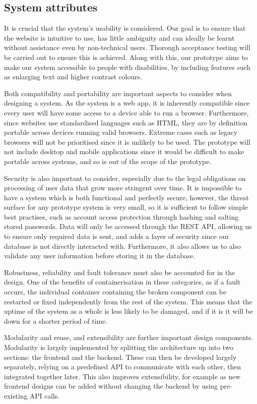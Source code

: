 \documentclass[10pt]{article}
\begin{document}
\subsection{System attributes}
It is crucial that the system's usability is considered. Our goal is to ensure
that the website is intuitive to use, has little ambiguity and can ideally be
learnt without assistance even by non-technical users. Thorough acceptance
testing will be carried out to ensure this is achieved. Along with this, our
prototype aims to make our system accessible to people with disabilities, by
including features such as enlarging text and higher contrast colours.

Both compatibility and portability are important aspects to consider when
designing a system. As the system is a web app, it is inherently compatible
since every user will have some access to a device able to run a browser.
Furthermore, since websites use standardised languages such as HTML, they are by
definition portable across devices running valid browsers. Extreme cases such as
legacy browsers will not be prioritised since it is unlikely to be used. The
prototype will not include desktop and mobile applications since it would be
difficult to make portable across systems, and so is out of the scope of the
prototype.

Security is also important to consider, especially due to the legal obligations
on processing of user data that grow more stringent over time. It is impossible
to have a system which is both functional and perfectly secure, however, the
threat surface for any prototype system is very small, so it is sufficient to
follow simple best practises, such as account access protection through hashing
and salting stored passwords. Data will only be accessed through the REST API,
allowing us to ensure only required data is sent, and adds a layer of security
since our database is not directly interacted with. Furthermore, it also allows
us to also validate any user information before storing it in the database.

Robustness, reliability and fault tolerance must also be accounted for in the
design. One of the benefits of containerisation in these categories, as if a
fault occurs, the individual container containing the broken component can be
restarted or fixed independently from the rest of the system. This means that
the uptime of the system as a whole is less likely to be damaged, and if it is
it will be down for a shorter period of time.

Modularity and reuse, and extensibility are further important design components.
Modularity is largely implemented by splitting the architecture up into two
sections: the frontend and the backend. These can then be developed largely
separately, relying on a predefined API to communicate with each other, then
integrated together later. This also improves extensibility, for example as new
frontend designs can be added without changing the backend by using pre-existing
API calls.
\end{document}
